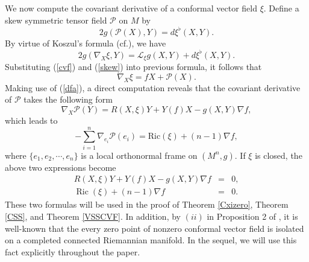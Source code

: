 \documentclass[10pt,leqno,oneside]{amsart}
\begin{document}
{         We now compute the covariant derivative of a conformal vector field $\xi.$ Define a skew symmetric tensor field $\mathcal{P}$ on $M$ by
         \begin{equation}\label{skew}2g(\mathcal{P}(X),Y)=d\xi^{\flat}(X,Y).\end{equation}
         By virtue of Koszul's formula {(cf.\cite[page 54]{Petersen2016})}, we have
         $$2g(\nabla_X\xi,Y)=\mathcal L_{\xi}g(X,Y)+d\xi^{\flat}(X,Y).$$
         Substituting (\ref{cvf}) and (\ref{skew}) into previous formula, it follows that
         \begin{equation}\label{dfa}\nabla_X\xi=fX+\mathcal{P}(X). \end{equation}
         Making use of (\ref{dfa}), a direct computation reveals that the covariant derivative of $\mathcal{P}$ takes the following form
         \begin{equation}\label{CovariantofP}
         \nabla_X\mathcal{P}(Y)=R(X,\xi)Y+Y(f)X-g(X,Y)\nabla f,
         \end{equation}
         which leads to
         \begin{equation}\label{divofP}
         -\sum_{i=1}^n\nabla_{e_{i}}\mathcal{P}(e_{i})=\text{Ric}(\xi)+(n-1)\nabla f,
         \end{equation}
         where $\{e_1, e_2, \cdots, e_n\}$ is a local orthonormal frame on $(M^n, g).$ If $\xi$ is closed, the above two expressions become
         \begin{eqnarray}\label{R}
               R(X,\xi)Y+Y(f)X-g(X,Y)\nabla f&=&0,\\\label{ricandf}
         \operatorname{Ric}(\xi)+(n-1) \nabla f&=&0.
         \end{eqnarray}
         These two formulas will be used in the proof of Theorem \ref{Cxizero}, Theorem \ref{CSS}, and Theorem \ref{VSSCVF}. In addition, by $(ii)$ in Proposition 2 of \cite{Kerbrat1976}, it is well-known that the every zero point of nonzero conformal vector field is isolated on a completed connected Riemannian manifold. In the sequel, we will use this fact explicitly throughout the paper.

}
\end{document}
